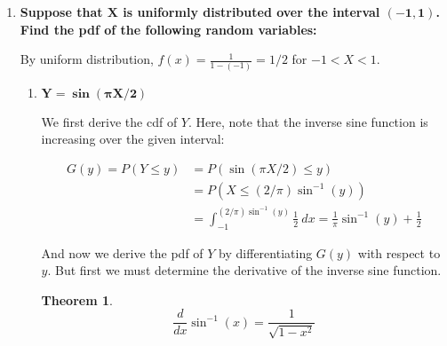 \documentclass[10pt, oneside]{article}   	%
\theoremstyle{definition}
\newtheorem*{thm}{Theorem}
\begin{document}
\begin{enumerate}[label=5.\arabic*]
\begin{enumerate}
	Then we derive $g(z)$ as follows:
	
	\[ G'(z) = g(z) = \boxed{1 / z^2} \]
	
	Note that $Z = 1 / (X + 1)$ over $0 < X < 1$ implies $1/2 < Z < 1$. Then $g(z) \geq 0$ over $1/2 < Z < 1$. Moreover, $G(1) - G(1/2) = \boxed{1}$.
	
	Alternatively, we can apply Theorem 5.1 because $Z = 1 / (X + 1)$ is monotonic over $1/2 < Z < 1$. Then $X(z) = 1/z - 1$ and $\frac{dx}{dz} = -1/z^2$, then $\big| \frac{dx}{dz} \big| = 1/z^2$. Therefore $g(z) = 1/z^2$, as expected.
	
	\end{enumerate}

\item  \begin{tcolorbox}[
  colback=Cerulean!5!white,
  colframe=Cerulean!75!black]
\textbf{Suppose that $\bm{X}$ is uniformly distributed over the interval $\bm{(-1,1)}$. Find the pdf of the following random variables:}
\end{tcolorbox}

By uniform distribution, $f(x) = \frac{1}{1 - (-1)} = 1/2$ for $-1 < X < 1$.

	\begin{enumerate}
	\item  \begin{tcolorbox}[
	  colback=Cerulean!5!white,
	  colframe=Cerulean!75!black]
	\textbf{$\bm{Y = \sin (\pi X / 2)}$}
	\end{tcolorbox}
	
	We first derive the cdf of $Y$. Here, note that the inverse sine function is increasing over the given interval:
	
	\begin{align*}
	G(y) = P(Y \leq y) &= P(\sin (\pi X / 2) \leq y) \\
	&= P(X \leq (2 / \pi) \sin^{-1} (y)) \\
	&= \int^{(2 / \pi) \sin^{-1} (y)}_{-1} \frac{1}{2} \ dx = \frac{1}{\pi} \sin^{-1} (y) + \frac{1}{2}
	\end{align*}
	
	And now we derive the pdf of $Y$ by differentiating $G(y)$ with respect to $y$. But first we must determine the derivative of the inverse sine function.
	
	\begin{thm}
	\[ \frac{d}{dx} \sin^{-1} (x) = \frac{1}{\sqrt{1 - x^2}} \]
	\end{thm}
	

\end{enumerate}
\end{enumerate}
\end{document}
